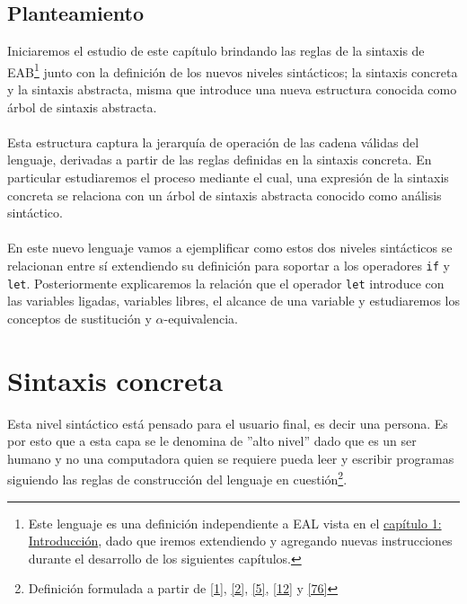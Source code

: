 \subsection*{Planteamiento}
Iniciaremos el estudio de este capítulo brindando las reglas de la sintaxis de \textsf{EAB}\footnote{Este lenguaje es una definición independiente a \textsf{EAL} vista en el \hyperref[sec:intro]{capítulo 1: Introducción}, dado que iremos extendiendo y agregando nuevas instrucciones durante el desarrollo de los siguientes capítulos.} junto con la definición de los nuevos niveles sintácticos; la sintaxis concreta y la sintaxis abstracta, misma que introduce una nueva estructura conocida como árbol de sintaxis abstracta.\\\\
 Esta estructura captura la jerarquía de operación de las cadena válidas del lenguaje, derivadas a partir de las reglas definidas en la sintaxis concreta. En particular estudiaremos el proceso mediante el cual, una expresión de la sintaxis concreta se relaciona con un árbol de sintaxis abstracta conocido como análisis sintáctico. \\\\
En este nuevo lenguaje vamos a ejemplificar como estos dos niveles sintácticos se relacionan entre sí extendiendo su definición para soportar a los operadores \texttt{if} y \texttt{let}. 
Posteriormente explicaremos la relación que el operador \texttt{let} introduce con las variables ligadas, variables libres, el alcance de una variable y estudiaremos los conceptos de sustitución y $\alpha$-equivalencia.

\section{Sintaxis concreta}

    Esta nivel sintáctico está pensado para el usuario final, es decir una persona. Es por esto que a esta capa se le denomina de ''alto nivel'' dado que es un ser humano y no una computadora quien se requiere pueda leer y escribir programas siguiendo las reglas de construcción del lenguaje en cuestión\footnote{Definición formulada a partir de \hyperlink{1}{[1]}, \hyperlink{2}{[2]}, \hyperlink{5}{[5]}, \hyperlink{12}{[12]} y \hyperlink{76}{[76]}}.

